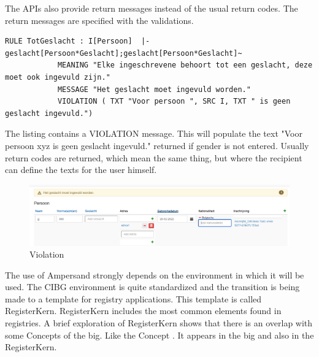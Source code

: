 The APIs also provide return messages instead of the usual return codes.
The return messages are specified with the validations.
\begin{lstlisting}[caption=Persoon.adl VIOLATION over \boxed{Geslacht}, numbers=none, label={lst:listingGenderRule}]
        RULE TotGeslacht : I[Persoon]  |-  geslacht[Persoon*Geslacht];geslacht[Persoon*Geslacht]~
            MEANING "Elke ingeschrevene behoort tot een geslacht, deze moet ook ingevuld zijn."
            MESSAGE "Het geslacht moet ingevuld worden."
            VIOLATION ( TXT "Voor persoon ", SRC I, TXT " is geen geslacht ingevuld.")
\end{lstlisting}
The listing  contains a VIOLATION message.
This will populate the text "Voor persoon xyz is geen geslacht ingevuld." returned if gender is not entered.
Usually return codes are returned, which mean the same thing, but where the recipient can define the texts for the user himself.
\begin{figure}
    \centering
    \includegraphics{docs/AF-SE/00_common/04_images/violation prototype.PNG}
    \caption{Violation }
    \label{fig:violation-geslacht}
\end{figure}

The use of Ampersand strongly depends on the environment in which it will be used.
The CIBG environment is quite standardized and the transition is being made to a template for registry applications.
This template is called RegisterKern.
RegisterKern includes the most common elements found in registries.
A brief exploration of RegisterKern shows that there is an overlap with some Concepts of the \acrshort{big}.
Like the Concept .
It appears in the \acrshort{big} and also in the RegisterKern.